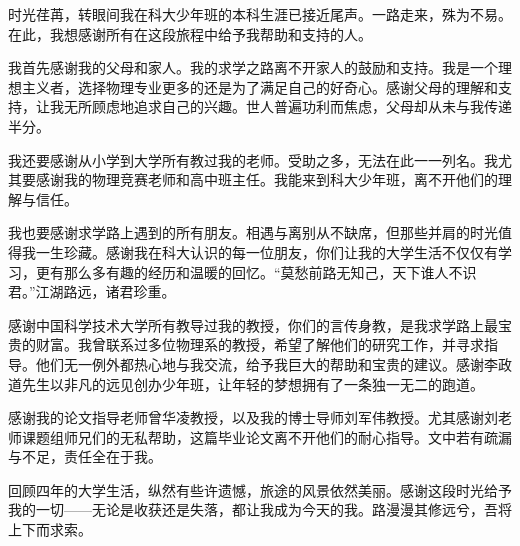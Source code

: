 
\begin{acknowledgements}

时光荏苒，转眼间我在科大少年班的本科生涯已接近尾声。一路走来，殊为不易。在此，我想感谢所有在这段旅程中给予我帮助和支持的人。

我首先感谢我的父母和家人。我的求学之路离不开家人的鼓励和支持。我是一个理想主义者，选择物理专业更多的还是为了满足自己的好奇心。感谢父母的理解和支持，让我无所顾虑地追求自己的兴趣。世人普遍功利而焦虑，父母却从未与我传递半分。

我还要感谢从小学到大学所有教过我的老师。受助之多，无法在此一一列名。我尤其要感谢我的物理竞赛老师和高中班主任。我能来到科大少年班，离不开他们的理解与信任。

我也要感谢求学路上遇到的所有朋友。相遇与离别从不缺席，但那些并肩的时光值得我一生珍藏。感谢我在科大认识的每一位朋友，你们让我的大学生活不仅仅有学习，更有那么多有趣的经历和温暖的回忆。“莫愁前路无知己，天下谁人不识君。”江湖路远，诸君珍重。

感谢中国科学技术大学所有教导过我的教授，你们的言传身教，是我求学路上最宝贵的财富。我曾联系过多位物理系的教授，希望了解他们的研究工作，并寻求指导。他们无一例外都热心地与我交流，给予我巨大的帮助和宝贵的建议。感谢李政道先生以非凡的远见创办少年班，让年轻的梦想拥有了一条独一无二的跑道。

感谢我的论文指导老师曾华凌教授，以及我的博士导师刘军伟教授。尤其感谢刘老师课题组师兄们的无私帮助，这篇毕业论文离不开他们的耐心指导。文中若有疏漏与不足，责任全在于我。

回顾四年的大学生活，纵然有些许遗憾，旅途的风景依然美丽。感谢这段时光给予我的一切——无论是收获还是失落，都让我成为今天的我。路漫漫其修远兮，吾将上下而求索。




\end{acknowledgements}
